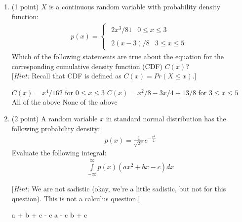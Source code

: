 \begin{enumerate}[start]
\vspace{0.5cm}

\begin{oneparcheckboxes}
\choice $\frac{1}{p(1-p)}$
\choice $\frac{1}{1 + p^2}$
\choice $\frac{2p}{1 - p}$
\choice A fair outcome cannot be generated with a biased coin
\end{oneparcheckboxes}

\vspace{0.5cm}

\item (1 point)
$X$ is a continuous random variable with probability density function:
%
\begin{align}
p(x) = \left\{ {\begin{array}{*{20}{c}}
{\begin{array}{*{20}{c}}
{2x^3/81}&{0 \le x \le 3}
\end{array}}\\
{\begin{array}{*{20}{c}}
{2(x-3)/8}&{3\le x \le 5}
\end{array}}
\end{array}} \right.
\end{align}
%
Which of the following statements are true about the equation for the corresponding cumulative density function (CDF) $C(x)$?\\
{[\emph{Hint:} Recall that CDF is defined as $C(x) = Pr(X \le x)$.]}\\
\begin{checkboxes}
	\choice $C(x) = x^4/162$  for   $0 \le x \le 3 $
	\choice $C(x) = x^2/8 -3x/4 + 13/8$ for  $3 \le x \le 5$
	\choice All of the above
	\choice None of the above
\end{checkboxes}

\item (2 point) A random variable $x$ in standard normal distribution 
has the following probability density:
%
\begin{align}
p(x) = \frac{1}{{\sqrt {2\pi } }}{e^{ - \frac{{{x^2}}}{2}}}
\end{align}
%
Evaluate the following integral:
%
\begin{align}
\int\limits_{ - \infty }^\infty  {p(x)(a{x^2} + b{x} - c)dx}
\end{align}

[\emph{Hint:} We are not sadistic (okay, we're a little sadistic, but not for this question). This is not a calculus question.]\\

\begin{oneparcheckboxes}
	\choice a + b + c
	\choice - c
	\choice a - c
	\choice b + c
\end{oneparcheckboxes}


\end{enumerate}

